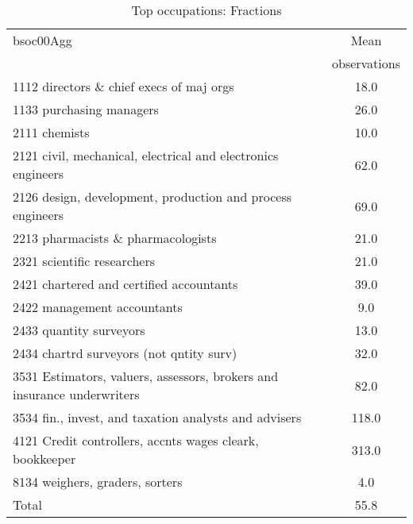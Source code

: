 \begin{table}
	\centering
	\caption{Top occupations: Fractions}
	\begin{tabular}{lc}
	\toprule	
		
bsoc00Agg&Mean \\
&observations \\
\hline
1112 directors \& chief execs of maj orgs&18.0 \\
1133 purchasing managers&26.0 \\
2111 chemists&10.0 \\
2121 civil, mechanical, electrical and electronics engineers&62.0 \\
2126 design, development, production and process engineers&69.0 \\
2213 pharmacists \& pharmacologists&21.0 \\
2321 scientific researchers&21.0 \\
2421 chartered and certified accountants&39.0 \\
2422 management accountants&9.0 \\
2433 quantity surveyors&13.0 \\
2434 chartrd surveyors (not qntity surv)&32.0 \\
3531 Estimators, valuers, assessors, brokers and insurance underwriters&82.0 \\
3534 fin., invest, and taxation analysts and advisers&118.0 \\
4121 Credit controllers, accnts wages cleark, bookkeeper&313.0 \\
8134 weighers, graders, sorters&4.0 \\
Total&55.8 \\
\bottomrule
\bottomrule
\end{tabular}
\end{table}
